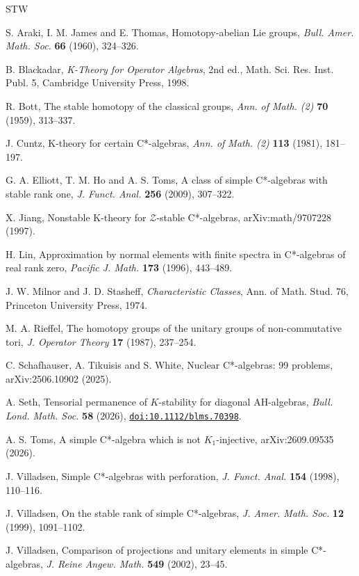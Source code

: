 \documentclass[11pt]{amsart}
\newcommand{\doi}[1]{\href{https://doi.org/#1}{\nolinkurl{doi:#1}}}
\theoremstyle{plain}
\theoremstyle{definition}
\begin{document}
\begin{thebibliography}{STW}
\raggedright

S. Araki, I. M. James and E. Thomas,
Homotopy-abelian Lie groups,
\emph{Bull. Amer. Math. Soc.} \textbf{66} (1960), 324--326.

B. Blackadar,
\emph{K-Theory for Operator Algebras}, 2nd ed.,
Math. Sci. Res. Inst. Publ. 5, Cambridge University Press, 1998.

R. Bott,
The stable homotopy of the classical groups,
\emph{Ann. of Math. (2)} \textbf{70} (1959), 313--337.

J. Cuntz,
K-theory for certain C*-algebras,
\emph{Ann. of Math. (2)} \textbf{113} (1981), 181--197.

G. A. Elliott, T. M. Ho and A. S. Toms,
A class of simple C*-algebras with stable rank one,
\emph{J. Funct. Anal.} \textbf{256} (2009), 307--322.

X. Jiang,
Nonstable K-theory for $\mathcal Z$-stable C*-algebras,
arXiv:math/9707228 (1997).

H. Lin,
Approximation by normal elements with finite spectra in C*-algebras of real
rank zero,
\emph{Pacific J. Math.} \textbf{173} (1996), 443--489.

J. W. Milnor and J. D. Stasheff,
\emph{Characteristic Classes},
Ann. of Math. Stud. 76, Princeton University Press, 1974.

M. A. Rieffel,
The homotopy groups of the unitary groups of non-commutative tori,
\emph{J. Operator Theory} \textbf{17} (1987), 237--254.

C. Schafhauser, A. Tikuisis and S. White,
Nuclear C*-algebras: 99 problems,
arXiv:2506.10902 (2025).

A. Seth,
Tensorial permanence of $K$-stability for diagonal AH-algebras,
\emph{Bull. Lond. Math. Soc.} \textbf{58} (2026), \doi{10.1112/blms.70398}.

A. S. Toms,
A simple C*-algebra which is not $K_1$-injective,
arXiv:2609.09535 (2026).

J. Villadsen,
Simple C*-algebras with perforation,
\emph{J. Funct. Anal.} \textbf{154} (1998), 110--116.

J. Villadsen,
On the stable rank of simple C*-algebras,
\emph{J. Amer. Math. Soc.} \textbf{12} (1999), 1091--1102.

J. Villadsen,
Comparison of projections and unitary elements in simple C*-algebras,
\emph{J. Reine Angew. Math.} \textbf{549} (2002), 23--45.

\end{thebibliography}
\end{document}
